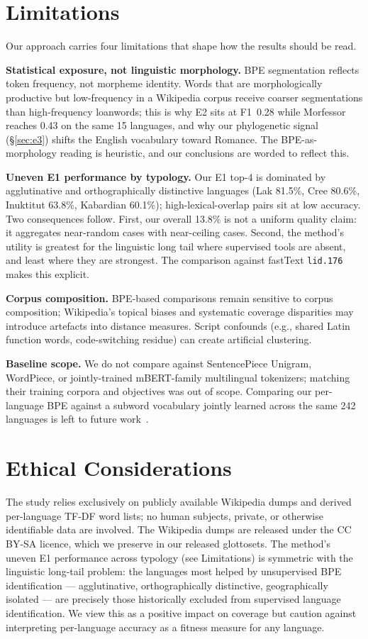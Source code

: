 \documentclass[11pt]{article}
\begin{document}
\section*{Limitations}
\label{sec:limits}

Our approach carries four limitations that shape how the results should be read.

\textbf{Statistical exposure, not linguistic morphology.} BPE segmentation reflects token frequency, not morpheme identity. Words that are morphologically productive but low-frequency in a Wikipedia corpus receive coarser segmentations than high-frequency loanwords; this is why E2 sits at F1~0.28 while Morfessor reaches 0.43 on the same 15 languages, and why our phylogenetic signal (\S\ref{sec:e3}) shifts the English vocabulary toward Romance. The BPE-as-morphology reading is heuristic, and our conclusions are worded to reflect this.

\textbf{Uneven E1 performance by typology.} Our E1 top-4 is dominated by agglutinative and orthographically distinctive languages (Lak 81.5\%, Cree 80.6\%, Inuktitut 63.8\%, Kabardian 60.1\%); high-lexical-overlap pairs sit at low accuracy. Two consequences follow. First, our overall 13.8\% is not a uniform quality claim: it aggregates near-random cases with near-ceiling cases. Second, the method's utility is greatest for the linguistic long tail where supervised tools are absent, and least where they are strongest. The comparison against fastText \texttt{lid.176} makes this explicit.

\textbf{Corpus composition.} BPE-based comparisons remain sensitive to corpus composition; Wikipedia's topical biases and systematic coverage disparities may introduce artefacts into distance measures. Script confounds (e.g., shared Latin function words, code-switching residue) can create artificial clustering.

\textbf{Baseline scope.} We do not compare against SentencePiece Unigram, WordPiece, or jointly-trained mBERT-family multilingual tokenizers; matching their training corpora and objectives was out of scope. Comparing our per-language BPE against a subword vocabulary jointly learned across the same 242 languages is left to future work~\citep{rust-etal-2021-good}.

\section*{Ethical Considerations}

The study relies exclusively on publicly available Wikipedia dumps and derived per-language TF-DF word lists; no human subjects, private, or otherwise identifiable data are involved. The Wikipedia dumps are released under the CC BY-SA licence, which we preserve in our released glottosets. The method's uneven E1 performance across typology (see Limitations) is symmetric with the linguistic long-tail problem: the languages most helped by unsupervised BPE identification --- agglutinative, orthographically distinctive, geographically isolated --- are precisely those historically excluded from supervised language identification. We view this as a positive impact on coverage but caution against interpreting per-language accuracy as a fitness measure for any language.
\end{document}
